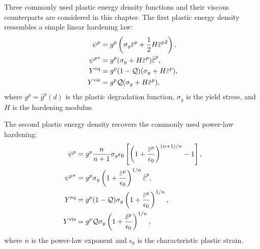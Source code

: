 Three commonly used plastic energy density functions and their viscous counterparts are considered in this chapter. The first plastic energy density ressembles a simple linear hardening law:
\begin{subequations}
  \begin{align}
    \psi^p       & = g^p \left( \sigma_y \ep + \dfrac{1}{2} H \ep^2 \right), \\
    {\psi^p}^*   & = g^p (\sigma_y + H \ep) \epdot,                          \\
    Y^\text{eq}  & = g^p (1-\tqf) (\sigma_y + H \ep),                        \\
    Y^\text{vis} & = g^p \tqf (\sigma_y + H \ep),                            
  \end{align}
\end{subequations}
where $g^p = \hat{g}^p(d)$ is the plastic degradation function, $\sigma_y$ is the yield stress, and $H$ is the hardening modulus.

The second plastic energy density recovers the commonly used power-law hardening:
\begin{subequations}
  \begin{align}
    \psi^p       & = g^p \dfrac{n}{n+1} \sigma_y \epsilon_0 \left[ \left( 1 + \dfrac{\ep}{\epsilon_0} \right)^{(n+1)/n} - 1 \right], \\
    {\psi^p}^*   & = g^p \sigma_y \left( 1 + \dfrac{\ep}{\epsilon_0} \right)^{1/n} \epdot,                                           \\
    Y^\text{eq}  & = g^p (1-\tqf) \sigma_y \left( 1 + \dfrac{\ep}{\epsilon_0} \right)^{1/n},                                         \\
    Y^\text{vis} & = g^p \tqf \sigma_y \left( 1 + \dfrac{\ep}{\epsilon_0} \right)^{1/n},                                             
  \end{align}
\end{subequations}
where $n$ is the power-law exponent and $\epsilon_0$ is the characteristic plastic strain.

